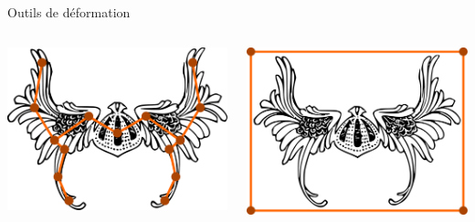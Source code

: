 \documentclass[xcolor=x11names,compress]{beamer}
\renewcommand{\(}{\begin{columns}} \renewcommand{\)}{\end{columns}}
\newcommand{\<}[1]{\begin{column}{#1}} \renewcommand{\>}{\end{column}}
\begin{document}
\begin{frame}{Outils de déformation}
\begin{columns}[t]
\begin{column}{0.5\textwidth}
  \end{column}
  \pause
\end{columns} 
\begin{columns}[t]
  \begin{column}{0.5\textwidth}
  \centering
    \includegraphics[scale=0.1]{Outil-Mono-Courbes}
  \end{column}
  \pause
  \begin{column}{0.5\textwidth}
  \centering
    \includegraphics[scale=0.1]{Outil-Mono-Surfaces}
  \end{column}
\end{columns} 
\end{frame}
\end{document}
